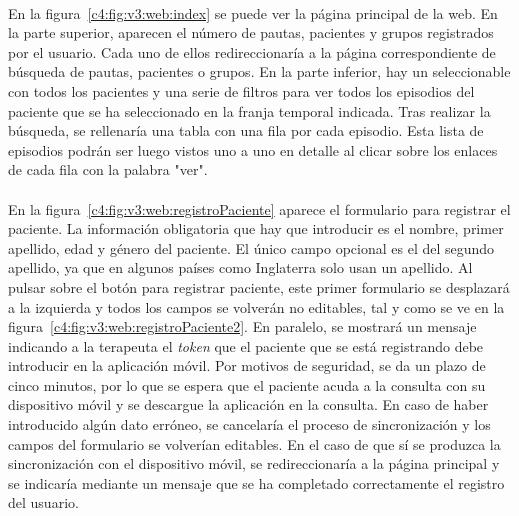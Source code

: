 \paragraph{}
En la figura~\ref{c4:fig:v3:web:index} se puede ver la página principal de la web. En la parte superior, aparecen el número de pautas, pacientes y grupos registrados por el usuario. Cada uno de ellos redireccionaría a la página correspondiente de búsqueda de pautas, pacientes o grupos. En la parte inferior, hay un seleccionable con todos los pacientes y una serie de filtros para ver todos los episodios del paciente que se ha seleccionado en la franja temporal indicada. Tras realizar la búsqueda, se rellenaría una tabla con una fila por cada episodio. Esta lista de episodios podrán ser luego vistos uno a uno en detalle al clicar sobre los enlaces de cada fila con la palabra "ver".

\paragraph{}
En la figura~\ref{c4:fig:v3:web:registroPaciente} aparece el formulario para registrar el paciente. La información obligatoria que hay que introducir es el nombre, primer apellido, edad y género del paciente. El único campo opcional es el del segundo apellido, ya que en algunos países como Inglaterra solo usan un apellido. Al pulsar sobre el botón para registrar paciente, este primer formulario se desplazará a la izquierda y todos los campos se volverán no editables, tal y como se ve en la figura~\ref{c4:fig:v3:web:registroPaciente2}. En paralelo, se mostrará un mensaje indicando a la terapeuta el \textit{token} que el paciente que se está registrando debe introducir en la aplicación móvil. Por motivos de seguridad, se da un plazo de cinco minutos, por lo que se espera que el paciente acuda a la consulta con su dispositivo móvil y se descargue la aplicación en la consulta. En caso de haber introducido algún dato erróneo, se cancelaría el proceso de sincronización y los campos del formulario se volverían editables. En el caso de que sí se produzca la sincronización con el dispositivo móvil, se redireccionaría a la página principal y se indicaría mediante un mensaje que se ha completado correctamente el registro del usuario.

